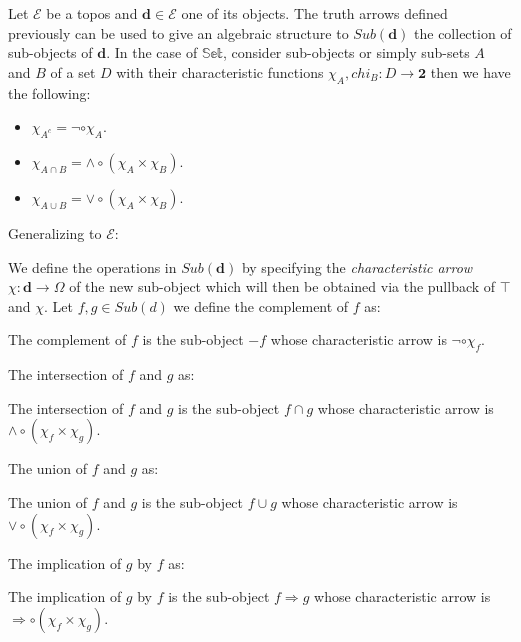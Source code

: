 Let $\mathcal{E}$ be a topos and $\textbf{d}\in \mathcal{E}$ one of its objects. \newline
The truth arrows defined previously can be used to give an algebraic structure to $Sub(\textbf{d})$ the collection of sub-objects of $\textbf{d}$. \newline
In the case of $\mathbb{Set}$, consider sub-objects or simply sub-sets $A$ and $B$ of a set $D$ with their characteristic functions $\chi_A, chi_B : D \rightarrow \textbf{2} $ then we have the following:
\begin{itemize}
	\item $\chi_{A^c} = \neg \circ \chi_A$.
	\item $\chi_{A \cap B} = \land \circ (\chi_A \times \chi_B)$.
	\item $\chi_{A \cup B} = \lor \circ (\chi_A \times \chi_B)$.	
\end{itemize}  

Generalizing to $\mathcal{E}$:
\newline

We define the operations in $Sub(\textbf{d})$ by specifying the \emph{characteristic arrow} $\chi : \textbf{d} \rightarrow \Omega$ of the new sub-object which will then be obtained via the pullback of $\top$ and $\chi$. \newline
Let $f,g \in Sub(d)$ we define the complement of $f$ as:

\begin{definition}[$-f$]
	The complement of $f$ is the sub-object $-f$ whose characteristic arrow is $\neg \circ \chi_f$.  
\end{definition}

The intersection of $f$ and $g$ as:

\begin{definition}[$f \cap g$]
	The intersection of $f$ and $g$ is the sub-object $f \cap g$ whose characteristic arrow is $\land \circ (\chi_f \times \chi_g)$.	
\end{definition}

The union of $f$ and $g$ as:

\begin{definition}[$f \cup g$]
	The union of $f$ and $g$ is the sub-object $f \cup g$ whose characteristic arrow is $\lor \circ (\chi_f \times \chi_g)$.	
\end{definition}

The implication of $g$ by $f$ as:

\begin{definition}[$f \Rightarrow g$]
	The implication of $g$ by $f$ is the sub-object $f \Rightarrow g$ whose characteristic arrow is $\Rightarrow \circ (\chi_f \times \chi_g)$.	
\end{definition}

